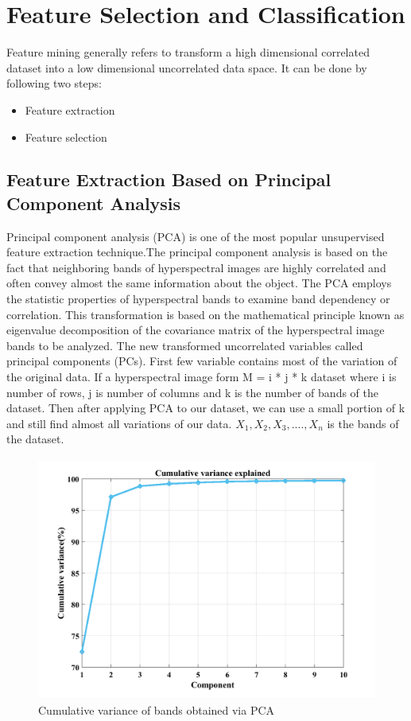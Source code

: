 \documentclass[document.tex]{subfiles}
\begin{document}
\chapter{Feature Selection and Classification}
\noindent Feature mining generally refers to transform a high dimensional correlated dataset into a low dimensional uncorrelated data space. It can be done by following two steps:
\begin{itemize}
	\item Feature extraction
	\item Feature selection
\end{itemize}

\section{Feature Extraction Based on Principal Component Analysis}
\noindent Principal component analysis (PCA)\cite{7} is one of the most popular unsupervised feature extraction technique.The principal component analysis is based on the fact that neighboring bands of hyperspectral images are highly correlated and often convey almost the same information about the object. The PCA employs the statistic properties of
hyperspectral bands to examine band dependency or correlation. This transformation
is based on the mathematical principle known as eigenvalue decomposition of the
covariance matrix of the hyperspectral image bands to be analyzed. The new transformed uncorrelated variables called principal components (PCs). First few variable contains most of the variation of the original data. If a hyperspectral image form M = i * j * k dataset where i is number of rows, j is number of columns and k is the number of bands of the dataset. Then after applying PCA to our dataset, we can use a small portion of k and still find almost all variations of our data. $X_1,X_2,X_3,....,X_n$ is the bands of the dataset. 
\begin{figure}[H]
	\begin{center}
		\includegraphics[height=8.0cm]{imgs/variance.png}
	\end{center}
	\caption{Cumulative variance of bands obtained via PCA}
	\label{fig:Cumulative variance of bands obtained via PCA}
\end{figure}
\end{document}
